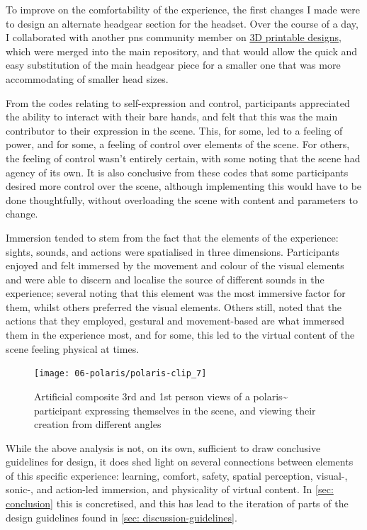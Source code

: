 To improve on the comfortability of the experience, the first changes I made were to design an alternate headgear section for the headset. Over the course of a day, I collaborated with another \gls{pns} community member on \href{https://github.com/AheadIO/Deck-X/tree/main/Deck_X/STL_files/Headgear/Welding_Headgear_Adaptor}{3D printable designs}, which were merged into the main repository, and that would allow the quick and easy substitution of the main headgear piece for a smaller one that was more accommodating of smaller head sizes.

From the codes relating to self-expression and control, participants appreciated the ability to interact with their bare hands, and felt that this was the main contributor to their expression in the scene. This, for some, led to a feeling of power, and for some, a feeling of control over elements of the scene. For others, the feeling of control wasn't entirely certain, with some noting that the scene had agency of its own. It is also conclusive from these codes that some participants desired more control over the scene, although implementing this would have to be done thoughtfully, without overloading the scene with content and parameters to change.

Immersion tended to stem from the fact that the elements of the experience: sights, sounds, and actions were spatialised in three dimensions. Participants enjoyed and felt immersed by the movement and colour of the visual elements and were able to discern and localise the source of different sounds in the experience; several noting that this element was the most immersive factor for them, whilst others preferred the visual elements. Others still, noted that the actions that they employed, gestural and movement-based are what immersed them in the experience most, and for some, this led to the virtual content of the scene feeling physical at times.

\begin{figure}[ht]
    \centering
    \texttt{[image: 06-polaris/polaris-clip\_7]}
    \captionsetup{justification=centering,margin=1.5cm}
    \caption{Artificial composite 3rd and 1st person views of a polaris\textasciitilde{} participant expressing themselves in the scene, and viewing their creation from different angles \citep[from][\href{https://youtu.be/H8d3n7eNKAg}{at 0:00}]{bilbow2022}}\label{fig: polaris-clip_7}
\end{figure}    

While the above analysis is not, on its own, sufficient to draw conclusive guidelines for design, it does shed light on several connections between elements of this specific experience: learning, comfort, safety, spatial perception, visual-, sonic-, and action-led immersion, and physicality of virtual content. In \autoref{sec: conclusion} this is concretised, and this has lead to the iteration of parts of the design guidelines found in \autoref{sec: discussion-guidelines}.
